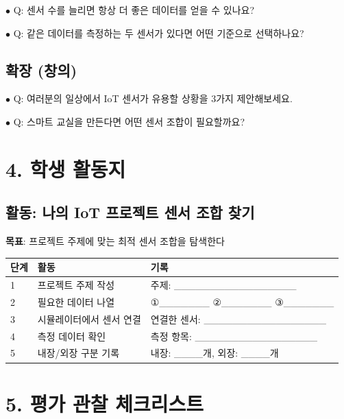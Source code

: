 \documentclass[11pt,a4paper]{article}
\begin{document}
$\bullet$ Q: 센서 수를 늘리면 항상 더 좋은 데이터를 얻을 수 있나요?

$\bullet$ Q: 같은 데이터를 측정하는 두 센서가 있다면 어떤 기준으로 선택하나요?


\subsection*{확장 (창의)}

$\bullet$ Q: 여러분의 일상에서 IoT 센서가 유용할 상황을 3가지 제안해보세요.

$\bullet$ Q: 스마트 교실을 만든다면 어떤 센서 조합이 필요할까요?



\section*{4. 학생 활동지}

\subsection*{활동: 나의 IoT 프로젝트 센서 조합 찾기}

\textbf{목표}: 프로젝트 주제에 맞는 최적 센서 조합을 탐색한다


\begin{center}
\renewcommand{\arraystretch}{1.4}
\begin{tabular}{|p{1.5cm}|p{6.2cm}|p{7.3cm}|}
\hline
\rowcolor{tableheader}
\textbf{단계} & \textbf{활동} & \textbf{기록} \\
\hline
1 & 프로젝트 주제 작성 & 주제: \_\_\_\_\_\_\_\_\_\_\_\_\_\_\_\_\_ \\
\hline
2 & 필요한 데이터 나열 & ①\_\_\_\_\_\_\_ ②\_\_\_\_\_\_\_ ③\_\_\_\_\_\_\_ \\
\hline
3 & 시뮬레이터에서 센서 연결 & 연결한 센서: \_\_\_\_\_\_\_\_\_\_\_\_\_\_\_\_\_ \\
\hline
4 & 측정 데이터 확인 & 측정 항목: \_\_\_\_\_\_\_\_\_\_\_\_\_\_\_\_\_ \\
\hline
5 & 내장/외장 구분 기록 & 내장: \_\_\_\_개, 외장: \_\_\_\_개 \\
\hline
\end{tabular}
\end{center}


\section*{5. 평가 관찰 체크리스트}
\end{document}
